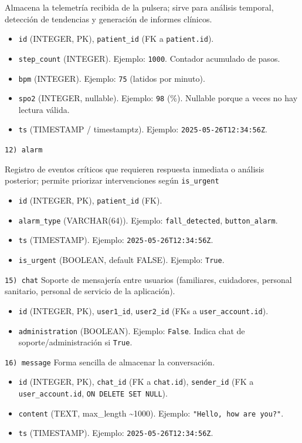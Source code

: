 \documentclass[12pt, a4paper]{article}
\begin{document}
Almacena la telemetría recibida de la pulsera; sirve para análisis temporal, detección de tendencias y generación de informes clínicos.
\begin{itemize}
	\item \texttt{id} (INTEGER, PK), \texttt{patient\_id} (FK a \texttt{patient.id}).
	\item \texttt{step\_count} (INTEGER). Ejemplo: \texttt{1000}. Contador acumulado de pasos.
	\item \texttt{bpm} (INTEGER). Ejemplo: \texttt{75} (latidos por minuto).
	\item \texttt{spo2} (INTEGER, nullable). Ejemplo: \texttt{98} (\%). Nullable porque a veces no hay lectura válida.
	\item \texttt{ts} (TIMESTAMP / timestamptz). Ejemplo: \texttt{2025-05-26T12:34:56Z}.
\end{itemize}

\texttt{12) alarm}

 Registro de eventos críticos que requieren respuesta inmediata o análisis posterior; permite priorizar intervenciones según \texttt{is\_urgent}
\begin{itemize}
	\item \texttt{id} (INTEGER, PK), \texttt{patient\_id} (FK).
	\item \texttt{alarm\_type} (VARCHAR(64)). Ejemplo: \texttt{fall\_detected}, \texttt{button\_alarm}.
	\item \texttt{ts} (TIMESTAMP). Ejemplo: \texttt{2025-05-26T12:34:56Z}.
	\item \texttt{is\_urgent} (BOOLEAN, default FALSE). Ejemplo: \texttt{True}.
\end{itemize}


\texttt{15) chat}
Soporte de mensajería entre usuarios (familiares, cuidadores, personal sanitario, personal de servicio de la aplicación). \\
\begin{itemize}
	\item \texttt{id} (INTEGER, PK), \texttt{user1\_id}, \texttt{user2\_id} (FKs a \texttt{user\_account.id}).
	\item \texttt{administration} (BOOLEAN). Ejemplo: \texttt{False}. Indica chat de soporte/administración si \texttt{True}.
\end{itemize}


\texttt{16) message}
Forma sencilla de almacenar la conversación.
\begin{itemize}
	\item \texttt{id} (INTEGER, PK), \texttt{chat\_id} (FK a \texttt{chat.id}), \texttt{sender\_id} (FK a \texttt{user\_account.id}, \texttt{ON DELETE SET NULL}).
	\item \texttt{content} (TEXT, max\_length \textasciitilde 1000). Ejemplo: \texttt{"Hello, how are you?"}.
	\item \texttt{ts} (TIMESTAMP). Ejemplo: \texttt{2025-05-26T12:34:56Z}.
\end{itemize}
\end{document}
